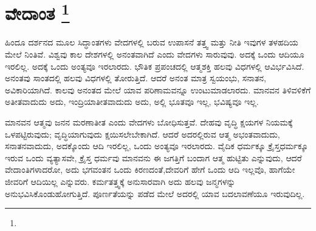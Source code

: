 
\chapter[ವೇದಾಂತ ]{ವೇದಾಂತ \protect\footnote{}}

ಹಿಂದೂ ದರ್ಶನದ ಮೂಲ ಸಿದ್ಧಾಂತಗಳು ವೇದಗಳಲ್ಲಿ ಬರುವ ಉಪಾಸನೆ ತತ್ತ್ವ ಮತ್ತು ನೀತಿ ಇವುಗಳ ತಳಹದಿಯ ಮೇಲೆ ನಿಂತಿವೆ. ವಿಶ್ವವು ಕಾಲ ದೇಶಗಳಲ್ಲಿ ಅನಂತವಾಗಿದೆ ಎಂದು ವೇದಗಳು ಸಾರುವುವು. ಅದಕ್ಕೆ ಒಂದು ಆದಿಯೂ ಇರಲಿಲ್ಲ. ಅದಕ್ಕೆ ಒಂದು ಅಂತ್ಯವೂ ಇರಲಾರದು. ಭೌತಿಕ ಪ್ರಪಂಚದಲ್ಲಿ ಆತ್ಮಶಕ್ತಿ ಹಲವು ವಿಧಗಳಲ್ಲಿ ಆವಿರ್ಭವಿಸಿದೆ. ಅನಂತವು ಸಾಂತದಲ್ಲಿ ಹಲವು ವಿಧಗಳಲ್ಲಿ ತೋರುತ್ತಿದೆ. ಆದರೆ ಅನಂತ ಮಾತ್ರ ಸ್ವಯಂಭು, ಸನಾತನ, ಅವಿಕಾರಿಯಾಗಿದೆ. ಕಾಲವು ಅನಂತದ ಮೇಲೆ ಯಾವ ಪರಿಣಾಮವನ್ನೂ ಉಂಟುಮಾಡಲಾರದು. ಮಾನವನ ತಿಳಿವಳಿಕೆಗೆ ಅತೀತವಾದುದು ಅದು, ಇಂದ್ರಿಯಾತೀತವಾದುದು ಅದು, ಅಲ್ಲಿ ಭೂತವೂ ಇಲ್ಲ, ಭವಿಷ್ಯವೂ ಇಲ್ಲ.

ಮಾನವನ ಆತ್ಮವು ಜನನ ಮರಣಾತೀತ ಎಂದು ವೇದಗಳು ಬೋಧಿಸುತ್ತವೆ. ದೇಹವು ವೃದ್ಧಿ ಕ್ಷಯಗಳ ನಿಯಮಕ್ಕೆ ಒಳಪಟ್ಟಿರುವುದು; ವೃದ್ಧಿಯಾಗುವುದು ಕ್ಷಯಿಸಲೇಬೇಕಾಗಿದೆ. ಆದರೆ ಅದರಲ್ಲಿರುವ ಆತ್ಮ ಅಭಂತವಾದುದು, ಸನಾತನವಾದುದು, ಅದಕ್ಕೊಂದು ಆದಿ ಇರಲಿಲ್ಲ, ಒಂದು ಅಂತ್ಯವೂ ಇರಲಾರದು. ವೈದಿಕ ಧರ್ಮಕ್ಕೂ ಕ್ರೈಸ್ತಧರ್ಮಕ್ಕೂ ಇರುವ ಒಂದು ವ್ಯತ್ಯಾಸವೇ, ಕ್ರೈಸ್ತ ಧರ್ಮವು ಮಾನವನು ಈ ಜಗತ್ತಿಗೆ ಬಂದಾಗ ಆತ್ಮ ಹುಟ್ಟಿತು ಎನ್ನುವುದು, ಆದರೆ ವೇದಾಂತಿಗಳಾದರೋ, ಅದು ಭಗವಂತನ ಒಂದು ಕಿರಣದಂತೆ,\break ದೇವರಿಗೆ ಹೇಗೆ ಒಂದು ಆದಿ ಇಲ್ಲವೊ, ಹಾಗೆಯೇ ಜೀವರಿಗೆ ಆದಿಯಿಲ್ಲ ಎನ್ನುವರು. ಕರ್ಮತತ್ತ್ವಕ್ಕೆ ಅನುಸಾರವಾಗಿ ಅದು ಹಲವು ಜನ್ಮಗಳನ್ನು ಅನುಭವಿಸಿಕೊಂಡು\break ಹೋಗುತ್ತಿದೆ. ಪೂರ್ಣತೆಯನ್ನು ಪಡೆದ ಮೇಲೆ ಅದರಲ್ಲಿ ಯಾವ ಬದಲಾವಣೆಯೂ ಇರುವುದಿಲ್ಲ.

